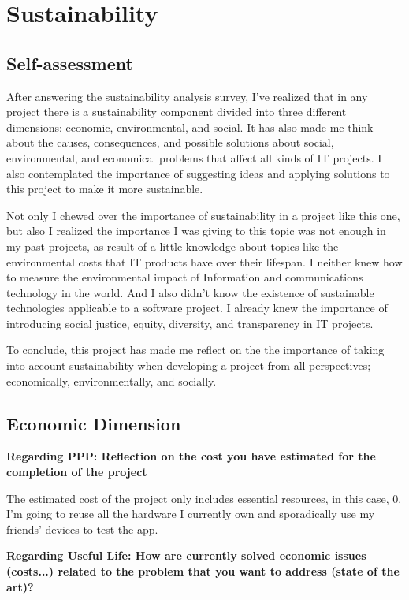 \section{Sustainability}
\subsection{Self-assessment}
After answering the sustainability analysis survey, I've realized that in any project there is a sustainability component divided into three different dimensions: economic, environmental, and social. It has also made me think about the causes, consequences, and possible solutions about social, environmental, and economical problems that affect all kinds of IT projects.
I also contemplated the importance of suggesting ideas and applying solutions to this project to make it more sustainable.

Not only I chewed over the importance of sustainability in a project like this one, but also I realized the importance I was giving to this topic was not enough in my past projects, as result of a little knowledge about topics like the environmental costs that IT products have over their lifespan. I neither knew how to measure the environmental impact of Information and communications technology in the world. And I also didn't know the existence of sustainable technologies applicable to a software project.
I already knew the importance of introducing social justice, equity, diversity, and transparency in IT projects.

To conclude, this project has made me reflect on the
the importance of taking into account sustainability when developing a project from all perspectives; economically, environmentally, and socially.

\subsection{Economic Dimension}
\noindent \textbf{Regarding PPP: Reflection on the cost you have estimated for the completion of the project}

The estimated cost of the project only includes essential resources, in this case, 0. I'm going to reuse all the hardware I currently own and sporadically use my friends' devices to test the app.


\noindent \textbf{Regarding Useful Life: How are currently solved economic issues (costs...) related to the problem that you want to address (state of the art)?}

